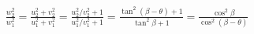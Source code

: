 \documentclass[10pt]{article}
\begin{document}
\begin{align*}\frac{w_{2}^{2}}{w_{1}^{2}}
=
\frac{u_{2}^{2}+v_{2}^{2}}{u_{1}^{2}+v_{1}^{2}}
=
\frac{ u_{2}^{2} / v_{2}^{2} + 1 }{ u_{1}^{2}/v_{1}^{2} + 1 }
=
\frac{ \tan^2 \left( \beta - \theta \right) + 1 }{ \tan^2 \beta + 1 }
=
\frac{ \cos^2 \beta }{ \cos^2 \left( \beta - \theta \right) }\end{align*}
\end{document}
